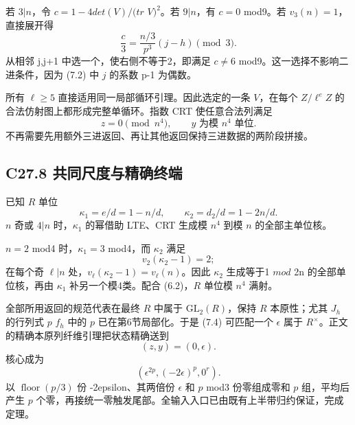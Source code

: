 \documentclass[11pt,a4paper]{article}
\theoremstyle{definition}
\numberwithin{equation}{section}
\begin{document}
{若} {\ensuremath{3|n}，令} {\ensuremath{c=1-4det(V)/(tr}} {\ensuremath{V)^{2}}。若} {\ensuremath{9|n}，有} {\ensuremath{c=0}} {mod9。若} {\ensuremath{v_{3}(n)=1}，直接展开得} \[
\frac c3=\frac{n/3}{p^3}(j-h)\pmod3.
\tag{C27.7.3}
\] {从相邻} {j,j+1} {中选一个，使右侧不等于2，即满足} {\ensuremath{c\ne 6}} {mod9。这一选择不影响二进条件，因为} {(7.2)} {中} {\ensuremath{j}} {的系数} {p-1} {为偶数。}

{所有} {\ensuremath{\ell \ge 5}} {直接适用同一局部循环引理。因此选定的一条} {\ensuremath{V}，在每个} {\ensuremath{Z/\ell ^{e}Z}} {的合法仿射图上都形成完整单循环。指数} {CRT} {使任意合法列满足} \[
z=0\pmod{n^4},\qquad y\text{ 为模 }n^4\text{ 单位}.
\tag{C27.7.4}
\] {不再需要先用额外三进返回、再让其他返回保持三进数据的两阶段拼接。}

\subsection*{\texorpdfstring{{C27.8} {共同尺度与精确终端}}{C27.8 共同尺度与精确终端}}\label{C27-h175}

{已知} {\ensuremath{R}} {单位} \[
\kappa_1=e/d=1-n/d,\qquad
\kappa_2=d_2/d=1-2n/d.
\] {\ensuremath{n}} {奇或} {\ensuremath{4|n}} {时，\ensuremath{\kappa _{1}}} {的幂借助} {LTE、CRT} {生成模} {\ensuremath{n^{4}}} {到模} {\ensuremath{n}} {的全部主单位核。}

{\ensuremath{n=2}} {mod4} {时，\ensuremath{\kappa _{1}=3}} {mod4，而} {\ensuremath{\kappa _{2}}} {满足} \[
v_2(\kappa_2-1)=2;
\] {在每个奇} {\ensuremath{\ell |n}} {处，\ensuremath{v_\ell (\kappa _{2}-1)=v_\ell (n)}。因此} {\ensuremath{\kappa _{2}}} {生成等于1} {\ensuremath{mod}} {2n} {的全部单位核，再由} {\ensuremath{\kappa _{1}}} {补另一个模4类。配合} {(6.2)，\ensuremath{R}} {单位模} {\ensuremath{n^{4}}} {满射。}

{全部所用返回的规范代表在最终} {\ensuremath{R}} {中属于} {\ensuremath{\mathrm{GL}_{2}(R)}，保持} {\ensuremath{R}} {本原性；尤其} {\ensuremath{J_{h}}} {的行列式} {\ensuremath{p}} {\ensuremath{f_{h}}} {中的} {\ensuremath{p}} {已在第6节局部化。于是} {(7.4)} {可匹配一个} {\ensuremath{\epsilon }} {属于} {\ensuremath{R^\times}。正文的精确本原列纤维引理把状态精确送到} \[
(z,y)=(0,\epsilon).
\] {核心成为} \[
(\epsilon^{2p},(-2\epsilon)^p,0^r).
\] {以} {\ensuremath{\operatorname{floor}(p/3)}} {份} {-2epsilon、其两倍份} {\ensuremath{\epsilon }} {和} {\ensuremath{p}} {mod3} {份零组成零和} {\ensuremath{p}} {组，平均后产生} {\ensuremath{p}} {个零，再接统一零触发尾部。全输入入口已由既有上半带归约保证，完成定理。}
\end{document}
